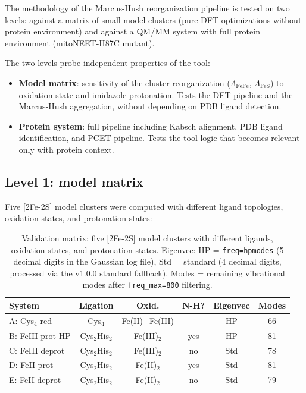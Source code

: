 \documentclass[11pt,a4paper,twoside]{article}
\theoremstyle{remark}
\begin{document}
The methodology of the Marcus-Hush reorganization pipeline is
tested on two levels: against a matrix of small model clusters
(pure DFT optimizations without protein environment) and against a
QM/MM system with full protein environment (mitoNEET-H87C mutant).

The two levels probe independent properties of the tool:

\begin{itemize}
  \item \textbf{Model matrix}: sensitivity of the cluster
        reorganization ($\Lambda_\text{FeFe}$,
        $\Lambda_\text{FeS}$) to oxidation state and imidazole
        protonation. Tests the DFT pipeline and the Marcus-Hush
        aggregation, without depending on PDB ligand detection.
  \item \textbf{Protein system}: full pipeline including Kabsch
        alignment, PDB ligand identification, and PCET pipeline.
        Tests the tool logic that becomes relevant only with
        protein context.
\end{itemize}

\subsection{Level 1: model matrix}
\label{sec:val-modell-matrix}

Five [2Fe-2S] model clusters were computed with different ligand
topologies, oxidation states, and protonation states:

\begin{table}[h]
\centering
\small
\begin{tabular}{|l|c|c|c|c|c|}
\hline
\textbf{System} & \textbf{Ligation} & \textbf{Oxid.} &
  \textbf{N-H?} & \textbf{Eigenvec} & \textbf{Modes} \\
\hline
A: Cys$_4$ red       & Cys$_4$    & Fe(II)+Fe(III) & --   & HP   & 66 \\
B: FeIII prot HP   & Cys$_2$His$_2$ & Fe(III)$_2$    & yes  & HP   & 81 \\
C: FeIII deprot      & Cys$_2$His$_2$ & Fe(III)$_2$    & no   & Std  & 78 \\
D: FeII prot         & Cys$_2$His$_2$ & Fe(II)$_2$     & yes  & Std  & 81 \\
E: FeII deprot       & Cys$_2$His$_2$ & Fe(II)$_2$     & no   & Std  & 79 \\
\hline
\end{tabular}
\caption{Validation matrix: five [2Fe-2S] model clusters with
different ligands, oxidation states, and protonation states.
Eigenvec: HP = \texttt{freq=hpmodes} (5 decimal digits in the
Gaussian log file), Std = standard (4 decimal digits, processed
via the v1.0.0 standard fallback). Modes = remaining vibrational
modes after \texttt{freq\_max=800} filtering.}
\label{tab:validierung-matrix}
\end{table}
\end{document}
